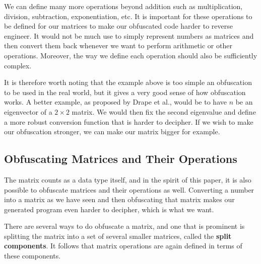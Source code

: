 We can define many more operations beyond addition such as multiplication,
division, subtraction, exponentiation, etc. It is important for these
operations to be defined for our matrices to make our obfuscated code harder to
reverse engineer. It would not be much use to simply represent numbers as
matrices and then convert them back whenever we want to perform arithmetic or
other operations. Moreover, the way we define each operation should also be
sufficiently complex.

It is therefore worth noting that the example above is too simple an
obfuscation to be used in the real world, but it gives a very good sense of how
obfuscation works. A better example, as proposed by Drape et al., would be to
have $ n $ be an eigenvector of a $ 2 \times 2 $ matrix. We would then fix the
second eigenvalue and define a more robust conversion function that is harder
to decipher. If we wish to make our obfuscation stronger, we can make our
matrix bigger for example.


\subsection{Obfuscating Matrices and Their Operations}
The matrix counts as a data type itself, and in the spirit of this paper, it is
also possible to obfuscate matrices and their operations as well. Converting a
number into a matrix as we have seen and then obfuscating that matrix makes our
generated program even harder to decipher, which is what we want.

There are several ways to do obfuscate a matrix, and one that is prominent is
splitting the matrix into a set of several smaller matrices, called the
\textbf{split components}. It follows that matrix operations are again defined
in terms of these components.
